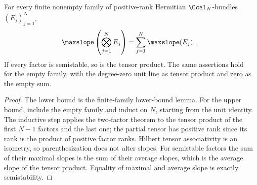 \begin{corollary}
\label{cor:bost-finite-family}
\leanok
For every finite nonempty family of positive-rank Hermitian
$\Ocal_K$-bundles $(E_j)_{j=1}^N$,
\[
 \maxslope\left(\bigotimes_{j=1}^N E_j\right)
 =\sum_{j=1}^N\maxslope(E_j).
\]
If every factor is semistable, so is the tensor product.
The same assertions hold for the empty family, with the degree-zero unit
line as tensor product and zero as the empty sum.
\end{corollary}
\begin{proof}
The lower bound is the finite-family lower-bound lemma. For the upper
bound, include the empty family and induct on $N$, starting from the
unit identity. The inductive step applies the two-factor theorem to the
tensor product of the first $N-1$ factors and the last one; the partial
tensor has positive rank since its rank is the product of positive
factor ranks. Hilbert tensor associativity is an isometry, so
parenthesization does not alter slopes. For semistable
factors the sum of their maximal slopes is the sum of their average
slopes, which is the average slope of the tensor product. Equality of
maximal and average slope is exactly semistability.
\end{proof}
